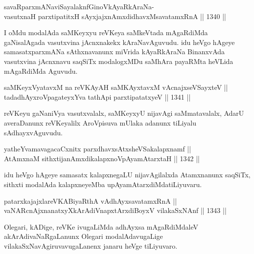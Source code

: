 \begin{shl}
savaRparxmANaviSayalaknfGinoV\s kAyaRkAraNa-\\
vasutxnaH parxtipatitxH sAyxjajxnAmxdidhavxMsavatamxRnA \hfill || 1340 ||  
\end{shl}

\begin{artha}
I oMdu modalAda saMKeyxyu reVKeya saMkeVtada mAgaRdiMda gaNisalAgada vasutxvina jAcnxnakekx kAraNavAguvudu. idu heVgo hAgeye samasatxparxmANa sAthxnavanunx miVrida kAyaRkAraNa BinanxvAda vasutxvina jAcnxnavu saqSiTx modalogxMDu saMhAra payaRMta heVLida mAgaRdiMda Aguvudu.
\end{artha}


\begin{shl}
saMKeyxVyatavxM na reVKAyAH saMKAyxtavxM vA\s cnajxseVSayxteV  || \\
tadadhAyxroVpagateyxYva tathA\s pi parxtipatatxyeV \hfill || 1341 ||  
\end{shl}

\begin{artha}
reVKeyu gaNaniVya vasutxvalalx, saMKeyxyU nijavAgi saMmatavalalx, AdarU averaDanunx reVKeyalilx AroVpisuva mUlaka adanunx tiLiyalu sAdhayxvAguvudu.
\end{artha}

\begin{shl}
yatheYvamavagacaCxnitx parxdhavxsAtxsheVSakalapxnamf || \\
AtAmxnaM sithxtijanAmxdikalapxnoVpAyamAtarxtaH \hfill || 1342 ||  
\end{shl}

\begin{artha}
idu heVgo hAgeye samasatx kalapxnegaLU nijavAgilalxda Atamxnanunx saqSiTx, sithxti modalAda kalapxneyeMba upAyamAtarxdiMda\break tiLiyuvaru.
\end{artha}


\begin{shl}
patarxkajajxlareVKABiyaRthA vA\s dhAyxsavatamxRnA || \\
vaNARcnAjxnanatxyXkArAdiVnapxtArxdiBoyxV vilakaSxNAnf  \hfill || 1343 ||  
\end{shl}

\begin{artha}
Olegari, kADige, reVKe ivugaLiMda adhAyxsa mAgaRdiMdaleV akArAdivaNaRgaLanunx Olegari modalAdavugaLige vilakaSxNavAgiruvavugaLanenx janaru heVge tiLiyuvaro.
\end{artha}

